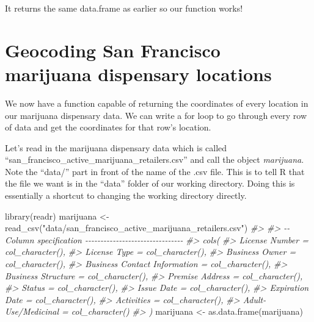 \documentclass[
  12pt,
  openany]{book}
\newenvironment{Shaded}{\begin{snugshade}}{\end{snugshade}}
\newcommand{\CommentTok}[1]{\textcolor[rgb]{0.37,0.37,0.37}{\textit{#1}}}
\newcommand{\FunctionTok}[1]{\textcolor[rgb]{0,0,0}{#1}}
\newcommand{\NormalTok}[1]{#1}
\newcommand{\OtherTok}[1]{\textcolor[rgb]{0.37,0.37,0.37}{#1}}
\newcommand{\StringTok}[1]{\textcolor[rgb]{0.5,0.5,0.5}{#1}}
\begin{document}
It returns the same data.frame as earlier so our function works!

\hypertarget{geocoding-san-francisco-marijuana-dispensary-locations}{%
\section{Geocoding San Francisco marijuana dispensary locations}\label{geocoding-san-francisco-marijuana-dispensary-locations}}

We now have a function capable of returning the coordinates of every location in our marijuana dispensary data. We can write a for loop to go through every row of data and get the coordinates for that row's location.

Let's read in the marijuana dispensary data which is called ``san\_francisco\_active\_marijuana\_retailers.csv'' and call the object \emph{marijuana}. Note the ``data/'' part in front of the name of the .csv file. This is to tell R that the file we want is in the ``data'' folder of our working directory. Doing this is essentially a shortcut to changing the working directory directly.

\begin{Shaded}
\begin{Highlighting}[]
\FunctionTok{library}\NormalTok{(readr)}
\NormalTok{marijuana }\OtherTok{\textless{}{-}} \FunctionTok{read\_csv}\NormalTok{(}\StringTok{"data/san\_francisco\_active\_marijuana\_retailers.csv"}\NormalTok{)}
\CommentTok{\#\textgreater{} }
\CommentTok{\#\textgreater{} {-}{-} Column specification {-}{-}{-}{-}{-}{-}{-}{-}{-}{-}{-}{-}{-}{-}{-}{-}{-}{-}{-}{-}{-}{-}{-}{-}{-}{-}{-}{-}{-}{-}{-}{-}}
\CommentTok{\#\textgreater{} cols(}
\CommentTok{\#\textgreater{}   \textasciigrave{}License Number\textasciigrave{} = col\_character(),}
\CommentTok{\#\textgreater{}   \textasciigrave{}License Type\textasciigrave{} = col\_character(),}
\CommentTok{\#\textgreater{}   \textasciigrave{}Business Owner\textasciigrave{} = col\_character(),}
\CommentTok{\#\textgreater{}   \textasciigrave{}Business Contact Information\textasciigrave{} = col\_character(),}
\CommentTok{\#\textgreater{}   \textasciigrave{}Business Structure\textasciigrave{} = col\_character(),}
\CommentTok{\#\textgreater{}   \textasciigrave{}Premise Address\textasciigrave{} = col\_character(),}
\CommentTok{\#\textgreater{}   Status = col\_character(),}
\CommentTok{\#\textgreater{}   \textasciigrave{}Issue Date\textasciigrave{} = col\_character(),}
\CommentTok{\#\textgreater{}   \textasciigrave{}Expiration Date\textasciigrave{} = col\_character(),}
\CommentTok{\#\textgreater{}   Activities = col\_character(),}
\CommentTok{\#\textgreater{}   \textasciigrave{}Adult{-}Use/Medicinal\textasciigrave{} = col\_character()}
\CommentTok{\#\textgreater{} )}
\NormalTok{marijuana }\OtherTok{\textless{}{-}} \FunctionTok{as.data.frame}\NormalTok{(marijuana)}
\end{Highlighting}
\end{Shaded}
\end{document}
